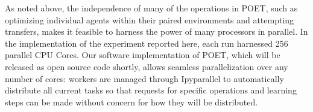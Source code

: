 \documentclass{article}
\newcommand{\jc}[1]{\comments{\textcolor{deepForestGreen}{[JC: #1]}}}
\newcommand{\ks}[1]{\comments{\textcolor{purple}{[Ken: #1]}}}
\newcommand{\rw}[1]{\comments{\textcolor{blue}{[Rui: #1]}}}
\newcommand{\comments}[1]{#1}
\begin{document}


As noted above, the independence of many of the operations in POET, such as optimizing individual agents within their paired environments and attempting transfers, makes it feasible to harness the power of many processors in parallel.  In the implementation of the experiment reported here, each run harnessed 256 parallel CPU Cores.
Our software implementation of POET, which will be released as open source code shortly,
allows seamless parallelization over any number of cores: workers are managed through Ipyparallel to automatically distribute all current tasks so that requests for specific operations and learning steps can be made without concern for how they will be distributed.
\end{document}
